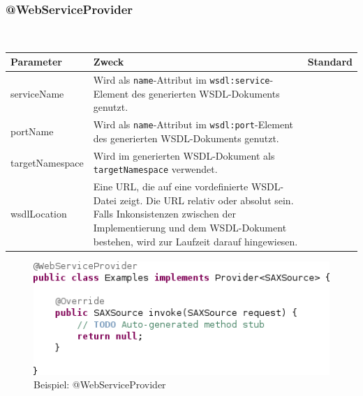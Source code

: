 \documentclass[runningheads]{llncs}
\newcommand{\germanquote}[1]{\glqq{}#1\grqq{}}
\newcommand{\anntabwidth}{\textwidth}
\begin{document}
    \subsubsection{@WebServiceProvider}\ \\
    \tymin=75pt
    \begin{tabulary}{\anntabwidth}{|l|L|L|}
    \hline
    \textbf{Parameter} & \textbf{Zweck} & \textbf{Standard} \\
    \hline
      serviceName &
      Wird als \texttt{name}-Attribut im \texttt{wsdl:service}-Element des generierten WSDL-\linebreak[0]Dokuments genutzt. &
      \germanquote{} \\
    \hline
      portName &
      Wird als \texttt{name}-Attribut im \texttt{wsdl:port}-Element des generierten WSDL-\linebreak[0]Dokuments genutzt. &
      \germanquote{} \\
    \hline
      targetNamespace &
      Wird im generierten WSDL-Dokument als \texttt{targetNamespace} verwendet. &
      \germanquote{} \\
    \hline
      wsdlLocation &
      Eine URL, die auf eine vordefinierte WSDL-Datei zeigt. Die URL relativ oder absolut sein. Falls Inkonsistenzen zwischen der Implementierung und dem WSDL-Dokument bestehen, wird zur Laufzeit darauf hingewiesen. &
      \germanquote{} \\
    \hline
    \end{tabulary} \vfill
    \tymin=10pt
    \begin{figure}[tbh]
      \centering
      \includegraphics[width=\textwidth]{../images/AtWebServiceProvider.png}
      \caption{Beispiel: @WebServiceProvider}
      \label{fig:wsp}
    \end{figure}
\end{document}
